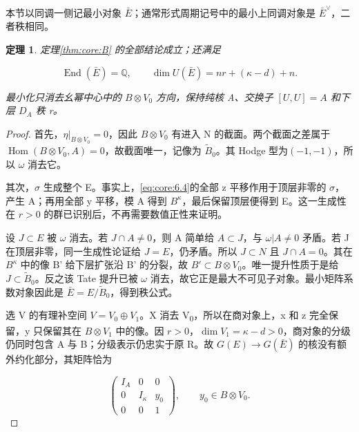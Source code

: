 \documentclass[11pt,a4paper,oneside]{ctexrep}
\theoremstyle{cnplain}
\newtheorem{theorem}{定理}[chapter]
\theoremstyle{definition}
\theoremstyle{remark}
\begin{document}
本节以同调一侧记最小对象 \(\bar E\)；通常形式周期记号中的最小上同调对象是 \(\bar E^\vee\)，二者秩相同。

\begin{theorem}

\label{thm:core:7.1} 定理\ref{thm:core:B} 的全部结论成立；还满足

\begin{equation}
\operatorname{End}(\bar E)=\mathbb Q,\qquad
 \dim U(\bar E)=nr+(\kappa-d)+n.                         \label{eq:core:7.1}
\end{equation}

最小化只消去幺幂中心中的 \(B\otimes V_{0}\) 方向，保持纯核 A、交换子 \([U,U]=A\) 和下层 \(D_A\) 秩 r。

\end{theorem}

\begin{proof}

首先，\(\eta|_{B\otimes V_0}=0\)，因此 \(B\otimes V_{0}\) 有进入 N 的截面。两个截面之差属于 \(\operatorname{Hom}(B\otimes V_0,A)=0\)，故截面唯一，记像为 \(\widetilde B_0\)。其 Hodge 型为\((- 1,- 1)\)，所以 \(\omega \) 消去它。

其次，\(\sigma \) 生成整个 E。事实上，\eqref{eq:core:6.4}的全部 z 平移作用于顶层非零的 \(\sigma \)，产生 A；再用全部 y 平移，模 A 得到 \(B^\kappa \)，最后保留顶层便得到 E。这一生成性在 \(r>0\) 的群已识别后，不再需要数值正性来证明。

设 \(J\subset E\) 被 \(\omega \) 消去。若 \(J\cap A\ne 0\)，则 A 简单给 \(A\subset J\)，与 \(\omega|A\ne0\) 矛盾。若 J 在顶层非零，同一生成性论证给 \(J=E\)，仍矛盾。所以 \(J\subset N\) 且 \(J\cap A=0\)。其在 \(B^\kappa \) 中的像 B' 给下层扩张沿 B' 的分裂，故 \(B'\subset B\otimes V_{0}\)。唯一提升性质于是给 \(J\subset\widetilde B_0\)。反之该 Tate 提升已被 \(\omega \) 消去，故它正是最大不可见子对象。最小矩阵系数对象因此是 \(\bar E=E/\widetilde B_0\)，得到秩公式。

选 V 的有理补空间 \(V=V_0\oplus V_1\)。X 消去 V\textsubscript{0}，所以在商对象上，x 和 z 完全保留，y 只保留其在 \(B\otimes V_{1}\) 中的像。因 \(r>0\)，\(\dim V_1=\kappa-d>0\)，商对象的分级仍同时包含 A 与 B；分级表示仍忠实于原 R。故 \(G(E)\to G(\bar E)\) 的核没有额外约化部分，其矩阵恰为

\begin{equation}
\begin{pmatrix}I_A&0&0\\0&I_\kappa&y_0\\0&0&1\end{pmatrix},
                 \qquad y_0\in B\otimes V_0.             \label{eq:core:7.2}
\end{equation}


\end{proof}
\end{document}
